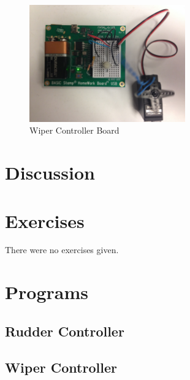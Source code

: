 \documentclass[11pt]{article}
\begin{document}
\begin{figure}
\centering
\includegraphics[width=0.6\textwidth]{wiper-controller.jpg}
\caption{Wiper Controller Board}
\label{wiper-controller}
\end{figure}

\section{Discussion}

\section{Exercises}

There were no exercises given.

\clearpage
\section{Programs}

\subsection{Rudder Controller}
\begingroup
\fontsize{11pt}{13pt}



\endgroup

\clearpage
\subsection{Wiper Controller}
\begingroup
\fontsize{9pt}{10pt}



\endgroup
\end{document}
